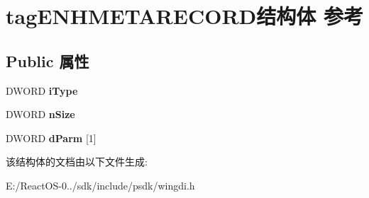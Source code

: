 \hypertarget{structtag_e_n_h_m_e_t_a_r_e_c_o_r_d}{}\section{tag\+E\+N\+H\+M\+E\+T\+A\+R\+E\+C\+O\+R\+D结构体 参考}
\label{structtag_e_n_h_m_e_t_a_r_e_c_o_r_d}
\subsection*{Public 属性}
\begin{DoxyCompactItemize}
\item 
\mbox{\label{structtag_e_n_h_m_e_t_a_r_e_c_o_r_d_a2844f63879df6abb9bb3aff1bf61332e}} 
D\+W\+O\+RD {\bfseries i\+Type}
\item 
\mbox{\label{structtag_e_n_h_m_e_t_a_r_e_c_o_r_d_a4cd3c5cb5a121cd36cafd90fea5a553a}} 
D\+W\+O\+RD {\bfseries n\+Size}
\item 
\mbox{\label{structtag_e_n_h_m_e_t_a_r_e_c_o_r_d_a59a40c2addb38606ccab745af6285d89}} 
D\+W\+O\+RD {\bfseries d\+Parm} \mbox{[}1\mbox{]}
\end{DoxyCompactItemize}


该结构体的文档由以下文件生成\+:\begin{DoxyCompactItemize}
\item 
E\+:/\+React\+O\+S-\/0../sdk/include/psdk/wingdi.\+h\end{DoxyCompactItemize}

